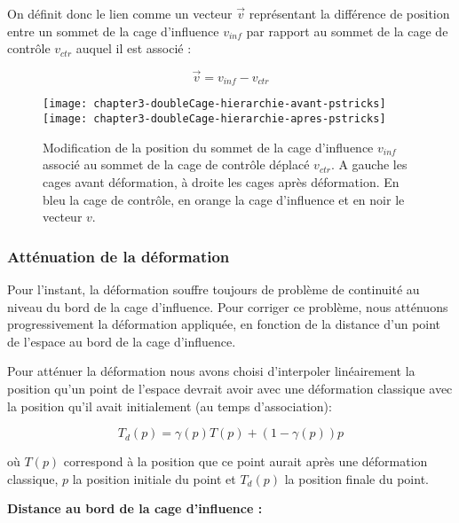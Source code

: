 On définit donc le lien comme un vecteur $\overrightarrow{v}$ représentant la
différence de position entre un sommet de la cage d'influence $v_{inf}$ par
rapport au sommet de la cage de contrôle $v_{ctr}$ auquel il est associé :

\begin{displaymath}
  \overrightarrow{v} = v_{inf}-v_{ctr}
\end{displaymath}

\begin{figure}[ht]
\begin{center}
  \texttt{[image: chapter3-doubleCage-hierarchie-avant-pstricks]}
  \texttt{[image: chapter3-doubleCage-hierarchie-apres-pstricks]}

  \caption[Association des cages de contrôle et d'influence] {Modification de
la position du sommet de la cage d'influence $v_{inf}$ associé au sommet de la
cage de contrôle déplacé $v_{ctr}$. A gauche les cages avant déformation, à
droite les cages après déformation. En bleu la cage de contrôle, en orange la
cage d'influence et en noir le vecteur $v$.}

  \label{MELHie}
\end{center}
\end{figure}

\subsubsection{Atténuation de la déformation}

Pour l'instant, la déformation souffre toujours de problème de continuité au
niveau du bord de la cage d'influence. Pour corriger ce problème, nous
atténuons progressivement la déformation appliquée, en fonction de la distance
d'un point de l'espace au bord de la cage d'influence.

Pour atténuer la déformation nous avons choisi d'interpoler linéairement la
position qu'un point de l'espace devrait avoir avec une déformation classique
avec la position qu'il avait initialement (au temps d'association):

\begin{equation}
  T_{d}(p) = \gamma(p) T(p) + (1-\gamma(p)) p
  \label{MELAtt}
\end{equation}

où $T(p)$ correspond à la position que ce point aurait après une déformation
classique, $p$ la position initiale du point et $T_{d}(p)$ la position finale
du point.

\textbf{Distance au bord de la cage d'influence :}

